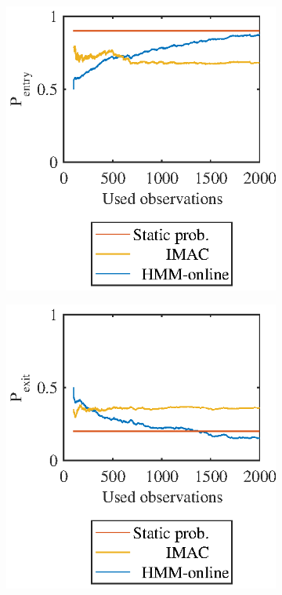 
\begin{figure}[htbp]
    \centering
    \begin{subfigure}[t]{0.45\textwidth}
        \includegraphics[width=1.0\textwidth]{chapters/mapping_of_dynamic_areas/figures/markow_learn_1d_entry}	
    \end{subfigure}
    \begin{subfigure}[t]{0.45\textwidth}
        \includegraphics[width=1.0\textwidth]{chapters/mapping_of_dynamic_areas/figures/markow_learn_1d_exit}

\end{subfigure}
\end{figure}
